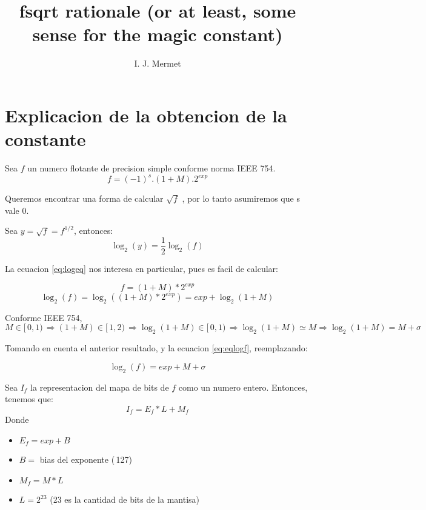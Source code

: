 \documentclass[]{article}
\title{fsqrt rationale (or at least, some sense for the magic constant)}
\author{I. J. Mermet}
\begin{document}
	
	\maketitle
	
	\section{Explicacion de la obtencion de la constante}
Sea \(f\) un numero flotante de precision simple conforme norma IEEE 754.
\begin{equation}
f = (-1)^{s}.(1+M).2^{exp}
\end{equation}

Queremos encontrar una forma de calcular \(\sqrt{f}\) , por lo tanto asumiremos que s vale 0.

Sea \(y=\sqrt{f}=f^{1/2}\), entonces:
\begin{equation} \label{eq:logeq}
\log_2(y)=\frac{1}{2}\log_2(f)
\end{equation}

La ecuacion \eqref{eq:logeq} nos interesa en particular, pues es facil de calcular:

\begin{equation}
f = (1 + M)*2^{exp}
\end{equation}
\begin{equation} \label{eq:eqlogf}
	\log_2(f) = \log_2((1 + M)*2^{exp}) = exp + \log_2(1+M)
\end{equation}

Conforme IEEE 754, \(M \in [\,0,1)\,\Rightarrow (1+M)\in[\,1,2)\,\Rightarrow\log_2(1+M)\in[\,0,1)\,\Rightarrow\log_2(1+M)\simeq M\Rightarrow\log_2(1+M)=M+\sigma \)

Tomando en cuenta el anterior resultado, y la ecuacion \eqref{eq:eqlogf}, reemplazando:

\begin{equation}
\log_2(f)=exp+M+\sigma
\end{equation}


Sea \(I_f\) la representacion del mapa de bits de \(f\) como un numero entero. Entonces, tenemos que:
\begin{equation}
I_f = E_f * L + M_f
\end{equation}
Donde \begin{itemize}
	\item \(E_f = exp + B\)
	\item \(B =\) bias del exponente (\,127)\,
	\item \(M_f = M * L\)
	\item \(L = 2^{23}\) (23 es la cantidad de bits de la mantisa)
\end{itemize}
\end{document}
